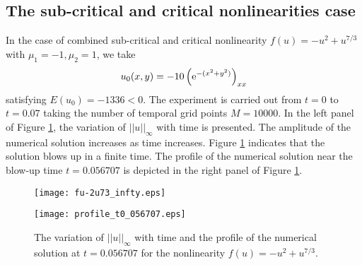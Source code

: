 \documentclass[10pt]{article}
\numberwithin{equation}{section}
\newcommand{\ee}{{\rm e}}
\begin{document}
		\subsection{The sub-critical and critical nonlinearities case} 
		In the case of combined sub-critical and critical  nonlinearity  $f(u)=-u^2+u^{7/3}$ with $\mu_1=-1, \mu_2=1$,  we  take
		\begin{equation}
			u_0(x,y)={-10}\left(\ee^ {-({x^2}+{y^2})}\right)_{xx} 
		\end{equation}
		satisfying $E(u_0)=-1336<0$.  The experiment is carried out  from $t = 0$ to $t = 0.07$ taking  the number of temporal
		grid points $M = 10000$.
		In the left panel of Figure \ref{u-2u73},
		the variation of $||u||_\infty$ with time is presented. The amplitude of the numerical solution increases as time increases. Figure \ref{u-2u73} indicates that the solution blows up in a finite time.
		The profile of the numerical solution near the blow-up time $t=0.056707$ is depicted in the right panel of Figure \ref{u-2u73}.
		\begin{figure}[!htbp] 
			\begin{minipage}[t]{0.45\linewidth}
				\centering
				\texttt{[image: fu-2u73\_infty.eps]}
			\end{minipage}%
			\hspace{40pt}
			\begin{minipage}[t]{0.45\linewidth}
				\centering
				\texttt{[image: profile\_t0\_056707.eps]}
			\end{minipage}
			\caption{  The variation of  $||u||_\infty$ with time  and  the profile of the numerical solution at  $t=0.056707$ for the nonlinearity $f(u)=-u^2+u^{7/3}$. }\label{u-2u73}
		\end{figure}
		
		
\end{document}
